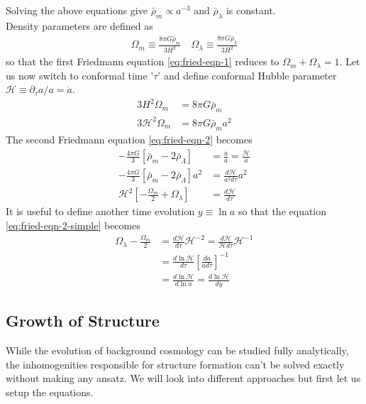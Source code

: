 \documentclass[12pt,twocolumn]{article}
\begin{document}
Solving the above equations give $\bar{\rho}_{m} \propto a^{-3}$ and $\bar{\rho}_{\lambda}$ is constant.\\
Density parameters are defined as
\begin{align}
\Omega_{m} \equiv \frac{8 \pi G \bar{\rho}_{m}}{3 H^2} \quad
\Omega_{\lambda} \equiv \frac{8 \pi G \bar{\rho}_{\lambda}}{3 H^2}
\end{align}
%
so that the first Friedmann equation \ref{eq:fried-eqn-1} reduces to $\Omega_{m} + \Omega_{\lambda} = 1$. Let us now switch to conformal time '$\tau$' and define conformal Hubble parameter $\mathcal{H} \equiv \partial_\tau a / a = \dot{a}$.
\begin{align}
3 H^2 \Omega_{m} &= 8 \pi G \bar{\rho}_{m}\\
3 \mathcal{H}^2 \Omega_{m} &= 8 \pi G \bar{\rho}_{m} a^2 \label{eq:omega-m-relation}
\end{align}
The second Friedmann equation \eqref{eq:fried-eqn-2} becomes 
\begin{align}
- \frac{4\pi G}{3} \left[ \bar{\rho}_{m} - 2 \bar{\rho}_{\Lambda} \right] &=  \frac{\ddot{a}}{a} = \frac{\dot{\mathcal{H}}}{a}\\
- \frac{4\pi G}{3} \left[ \bar{\rho}_{m} - 2 \bar{\rho}_{\Lambda} \right] a^2 &= \frac{d \mathcal{H}}{a^2 d\tau} a^2\\
\label{eq:fried-eqn-2-simple}
\mathcal{H}^2 \left[ - \frac{\Omega_{m}}{2} + \Omega_{\lambda} \right] &= \frac{d \mathcal{H}}{d\tau}
\end{align} 
It is useful to define another time evolution $y \equiv \ln a$ so that the equation \eqref{eq:fried-eqn-2-simple} becomes
\begin{align}
\Omega_{\lambda} - \frac{\Omega_{m}}{2} &= \frac{d \mathcal{H}}{d\tau} \mathcal{H}^{-2} = \frac{d \mathcal{H}}{\mathcal{H} d\tau} \mathcal{H}^{-1}\\
&= \frac{d \ln \mathcal{H}}{d\tau}
 \left[ \frac{da}{a d\tau} \right]^{-1}\\
&=  \frac{d \ln \mathcal{H}}{d \ln a} = \frac{d \ln \mathcal{H}}{d y} 
\end{align}

\subsection{Growth of Structure}
While the evolution of background cosmology can be studied fully analytically, the inhomogenities responsible for structure formation can't be solved exactly without making any ansatz. We will look into different approaches but first let us setup the equations.
\end{document}
